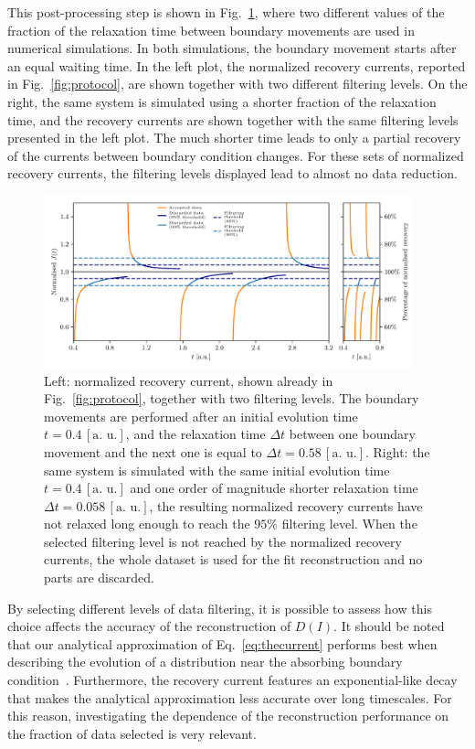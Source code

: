 {This post-processing step is shown in Fig.~\ref{fig:postprocessing}, where two different values of the fraction of the relaxation time between boundary movements are used in numerical simulations. In both simulations, the boundary movement starts after an equal waiting time. In the left plot, the normalized recovery currents, reported in Fig.~\ref{fig:protocol}, are shown together with two different filtering levels. On the right, the same system is simulated using a shorter fraction of the relaxation time, and the recovery currents are shown together with the same filtering levels presented in the left plot. The much shorter time leads to only a partial recovery of the currents between boundary condition changes. For these sets of normalized recovery currents, the filtering levels displayed lead to almost no data reduction.
%
\begin{figure}[t]
    \centering 
    \includegraphics[width=0.95\textwidth]{4_probing_the_diffusive_behavior/figs/final/the_discarded_data.pdf}
    \caption{Left: normalized recovery current, shown already in Fig.~\ref{fig:protocol}, together with two filtering levels. The boundary movements are performed after an initial evolution time $t=0.4 \, [\text{a. u.}]$, and the relaxation time $\Delta t$ between one boundary movement and the next one is equal to $\Delta t=0.58 \, [\text{a. u.}]$. Right: the same system is simulated with the same initial evolution time $t=0.4 \, [\text{a. u.}]$ and one order of magnitude shorter relaxation time $\Delta t=0.058 \, [\text{a. u.}]$, the resulting normalized recovery currents have not relaxed long enough to reach the $95\%$ filtering level. When the selected filtering level is not reached by the normalized recovery currents, the whole dataset is used for the fit reconstruction and no parts are discarded.}
    \label{fig:postprocessing}
\end{figure}
%

By selecting different levels of data filtering, it is possible to assess how this choice affects the accuracy of the reconstruction of $D(I)$. It should be noted that our analytical approximation of Eq.~\eqref{eq:thecurrent} performs best when describing the evolution of a distribution near the absorbing boundary condition~\cite{montanari:ipac2021:tupab233}. Furthermore, the recovery current features an exponential-like decay that makes the analytical approximation less accurate over long timescales. For this reason, investigating the dependence of the reconstruction performance on the fraction of data selected is very relevant.

}
